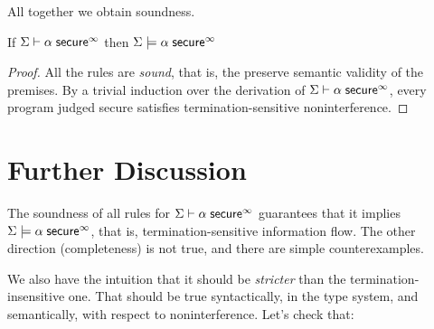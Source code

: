\documentclass[11pt]{article}
\begin{document}
All together we obtain soundness.

\begin{theorem}
  If $\Sigma \vdash \alpha\; \mathsf{secure}^\infty$ then $\Sigma \models \alpha\; \mathsf{secure}^\infty$
\end{theorem}
\begin{proof}
  All the rules are \emph{sound}, that is, the preserve semantic validity of the
  premises.  By a trivial induction over the derivation of $\Sigma \vdash \alpha\; \mathsf{secure}^\infty$,
  every program judged secure satisfies termination-sensitive noninterference.
\end{proof}

\section{Further Discussion}

The soundness of all rules for $\Sigma \vdash \alpha\; \mathsf{secure}^\infty$ guarantees
that it implies $\Sigma \models \alpha\; \mathsf{secure}^\infty$, that is,
termination-sensitive information flow.  The other direction (completeness) is
not true, and there are simple counterexamples.

We also have the intuition that it should be \emph{stricter} than the
termination-insensitive one.  That should be true syntactically, in the type system,
and semantically, with respect to noninterference.  Let's check that:
\end{document}
